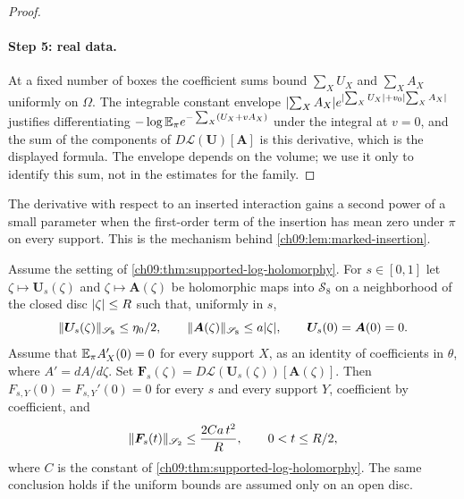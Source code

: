 \begin{proof}
\paragraph{Step 5: real data.}
At a fixed number of boxes the coefficient sums bound $\sum_XU_X$ and $\sum_XA_X$ uniformly on $\Omega$. The integrable constant envelope $\lvert \sum_XA_X\rvert e^{\lvert \sum_XU_X\rvert+v_0\lvert \sum_XA_X\rvert}$ justifies differentiating $-\log\mathbb E_\pi e^{-\sum_X(U_X+vA_X)}$ under the integral at $v=0$, and the sum of the components of $D\boldsymbol{\mathcal L}(\boldsymbol U)[\boldsymbol A]$ is this derivative, which is the displayed formula. The envelope depends on the volume; we use it only to identify this sum, not in the estimates for the family.
\end{proof}

The derivative with respect to an inserted interaction gains a second power of a small parameter when the first-order term of the insertion has mean zero under $\pi$ on every support. This is the mechanism behind \cref{ch09:lem:marked-insertion}.

\begin{corollary}\label{ch09:cor:supported-mark-two-powers}
Assume the setting of \cref{ch09:thm:supported-log-holomorphy}. For $s\in[0,1]$ let $\zeta\mapsto\boldsymbol U_s(\zeta)$ and $\zeta\mapsto\boldsymbol A(\zeta)$ be holomorphic maps into $\mathscr S_8$ on a neighborhood of the closed disc $\lvert \zeta\rvert\le R$ such that, uniformly in $s$,
\[
 \lVert \boldsymbol U_s(\zeta)\rVert_{\mathscr S_8}\le\eta_0/2,\qquad
 \lVert \boldsymbol A(\zeta)\rVert_{\mathscr S_8}\le a\lvert \zeta\rvert,\qquad
 \boldsymbol U_s(0)=\boldsymbol A(0)=0.
\]
Assume that $\mathbb E_\pi A_X'(0)=0$ for every support $X$, as an identity of coefficients in $\theta$, where $A'=dA/d\zeta$. Set $\boldsymbol F_s(\zeta)=D\boldsymbol{\mathcal L}(\boldsymbol U_s(\zeta))[\boldsymbol A(\zeta)]$. Then $F_{s,Y}(0)=F_{s,Y}'(0)=0$ for every $s$ and every support $Y$, coefficient by coefficient, and
\begin{equation}\label{ch09:eq:supported-mark-two-powers}
 \lVert \boldsymbol F_s(t)\rVert_{\mathscr S_2}\le\frac{2Ca\,t^2}{R},\qquad0<t\le R/2,
\end{equation}
where $C$ is the constant of \cref{ch09:thm:supported-log-holomorphy}. The same conclusion holds if the uniform bounds are assumed only on an open disc.
\end{corollary}

